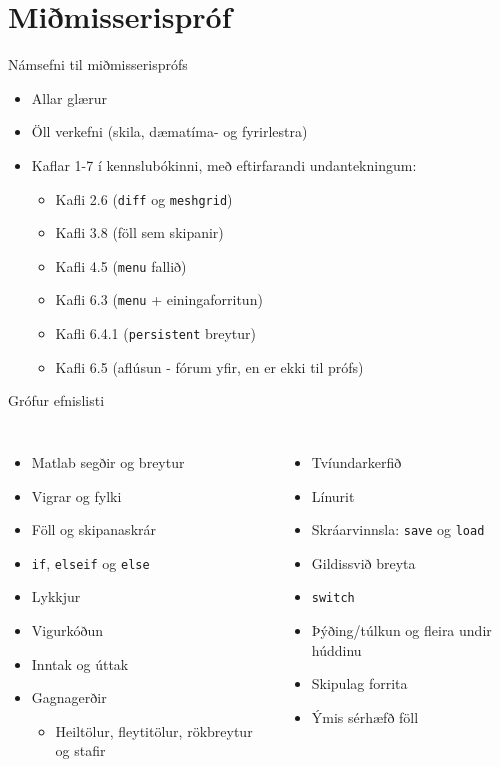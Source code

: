 \documentclass{beamer}
\begin{document}
\section{Miðmisserispróf}

\begin{frame}{Námsefni til miðmisserisprófs}
\begin{itemize}
 \item Allar glærur
 \item Öll verkefni (skila, dæmatíma- og fyrirlestra)
 \item Kaflar 1-7 í kennslubókinni, með eftirfarandi undantekningum:
 \begin{itemize}
  \item Kafli 2.6 (\texttt{diff} og \texttt{meshgrid})
  \item Kafli 3.8 (föll sem skipanir)
  \item Kafli 4.5 (\texttt{menu} fallið)
  \item Kafli 6.3 (\texttt{menu} + einingaforritun)
  \item Kafli 6.4.1 (\texttt{persistent} breytur)
  \item Kafli 6.5 (aflúsun - fórum yfir, en er ekki til prófs)
 \end{itemize}
\end{itemize}
\end{frame}

\begin{frame}{Grófur efnislisti}
\begin{columns}
\begin{itemize}
 \item Matlab segðir og breytur
 \item Vigrar og fylki
 \item Föll og skipanaskrár
 \item \texttt{if}, \texttt{elseif} og \texttt{else}
 \item Lykkjur
 \item Vigurkóðun
 \item Inntak og úttak
 \item Gagnagerðir
 \begin{itemize}
  \item Heiltölur, fleytitölur, rökbreytur og stafir
 \end{itemize}
\end{itemize}
\begin{itemize}
 \item Tvíundarkerfið
 \item Línurit
 \item Skráarvinnsla: \texttt{save} og \texttt{load}
 \item Gildissvið breyta
 \item \texttt{switch}
 \item Þýðing/túlkun og fleira undir húddinu
 \item Skipulag forrita
 \item Ýmis sérhæfð föll
\end{itemize}

\end{columns}
\end{frame}
\end{document}
